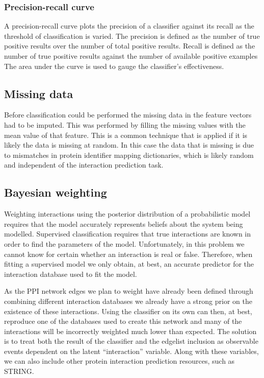 \subsubsection*{Precision-recall curve}
A precision-recall curve plots the precision of a classifier against its recall as the threshold of classification is varied.
The precision is defined as the number of true positive results over the number of total positive results.
Recall is defined as the number of true positive results against the number of available positive examples
The area under the curve is used to gauge the classifier's effectiveness.


\subsection{Missing data}
Before classification could be performed the missing data in the feature vectors had to be imputed.
This was performed by filling the missing values with the mean value of that feature.
This is a common technique that is applied if it is likely the data is missing at random.
In this case the data that is missing is due to mismatches in protein identifier mapping dictionaries, which is likely random and independent of the interaction prediction task.

\subsection{Bayesian weighting}
\label{bayes}

Weighting interactions using the posterior distribution of a probabilistic model requires that the model accurately represents beliefs about the system being modelled.
Supervised classification requires that true interactions are known in order to find the parameters of the model.
Unfortunately, in this problem we cannot know for certain whether an interaction is real or false.
Therefore, when fitting a supervised model we only obtain, at best, an accurate predictor for the interaction database used to fit the model.

As the PPI network edges we plan to weight have already been defined through combining different interaction databases we already have a strong prior on the existence of these interactions.
Using the classifier on its own can then, at best, reproduce one of the databases used to create this network and many of the interactions will be incorrectly weighted much lower than expected.
The solution is to treat both the result of the classifier and the edgelist inclusion as observable events dependent on the latent ``interaction'' variable.
Along with these variables, we can also include other protein interaction prediction resources, such as STRING\autocite{von_mering_string:_2005}.

